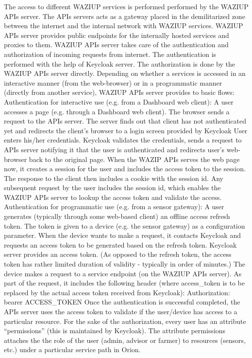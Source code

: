 The access to different WAZIUP services is performed performed by the WAZIUP APIs server. The APIs servers acts as a gateway placed in the demilitarized zone between the internet and the internal network with WAZIUP services. WAZIUP APIs server provides public endpoints for the internally hosted services and proxies to them. 
WAZIUP APIs server takes care of the authentication and authorization of incoming requests from internet. The authentication is performed with the help of Keycloak server. The authorization is done by the WAZIUP APIs server directly.
Depending on whether a services is accessed in an interactive manner (from the web-browser) or in a programmatic manner (directly from another service), WAZIUP APIs server provides to basic flows:
Authentication for interactive use (e.g. from a Dashboard web client):
A user accesses a page (e.g. through a Dashboard web client). The browser sends a request to the APIs server.
The server finds out that client has not authenticated yet and redirects the client’s browser to a login screen provided by Keycloak
User enters his/her credentials.
Keycloak validates the credentials, sends a request to APIs server notifying it that the user is authenticated and redirects user’s web-browser back to the original page.
When the WAZIP APIs serves the web page now, it creates a session for the user and includes the access token to the session. The response to the client then includes a cookie with the session id.
Any subsequent request by the user includes the session id, which enables the WAZIUP APIs server to lookup the access token and validate the access.
Authentication for programmatic use (e.g. from a sensor gateway):
A user generates (typically through some web-based client) an offline access refresh token. The token is given to a device (e.g. the sensor gateway) as a configuration parameter.
When the device wants to make a request, it contacts Keycloak and requests an access token to be generated based on the refresh token.
Keycloak server provides an access token. (As opposed to the refresh token, the access token has rather limited duration of validity - typically in order of minutes.)
The device makes a request to a service endpoint (on the WAZIUP APIs server). As part of the request, it includes the following header (where access_token is to be replaced by the actual access token received from Keycloak):
Authorization: bearer ACCESS_TOKEN
Once the authentication is successful completed, the APIs server uses the access token to validate if the user/device has access to a particular resource.
For the sake of the authorization, every user has an attribute “permissions” (this is maintained by Keycloak). The attribute permissions attaches the the role of the user (admin, advisor or farmer) to resources (sensors, etc.) under a particular service path in Orion. 

